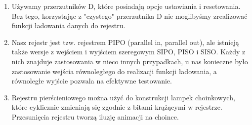 \documentclass[12pt,a4paper,openright]{mwrep}
\begin{document}
    \begin{enumerate}
        \item Używamy przerzutników D, które posiadają opcje ustawiania i resetowania. Bez tego, korzystając
        z "czystego" przerzutnika D nie moglibyśmy zrealizować funkcji ładowania danych do rejestru. 
        
        \item Nasz rejestr jest tzw. rejestrem PIPO (parallel in, parallel out), ale istnieją także wersje
        z wejściem i wyjściem szeregowym SIPO, PISO i SISO. Każdy z nich znajduje zastosowania w nieco innych 
        przypadkach, u nas konieczne było zastosowanie wejścia równoległego do realizacji funkcji ładowania, a 
        równoległe wyjście pozwala na efektywne testowanie.

        \item Rejestru pierścieniowego można użyć do konstrukcji lampek choinkowych, które cyklicznie zmieniają
        się zgodnie z bitami krążącymi w rejestrze. Przesunięcia rejestru tworzą iluzję animacji na choince.
        
    \end{enumerate}
\end{document}
